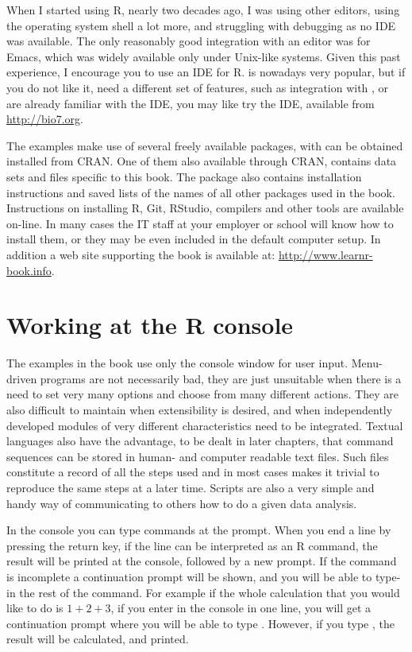 \documentclass[krantz2,ChapterTOCs]{krantz}\usepackage{knitr}
\begin{document}
When I started using R, nearly two decades ago, I was using other editors, using the operating system shell a lot more, and struggling with debugging as no IDE was available. The only reasonably good integration with an editor was for Emacs, which was widely available only under Unix-like systems. Given this past experience, I encourage you to use an IDE for R. \RStudio is nowadays very popular, but if you do not like it, need a different set of features, such as integration with , or are already familiar with the  IDE, you may like try the  IDE, available from \url{http://bio7.org}.

The examples make use of several freely available packages, with can be obtained installed from CRAN. One of them  also available through CRAN, contains data sets and files specific to this book. The  package also contains installation instructions and saved lists of the names of all other packages used in the book. Instructions on installing R, Git, RStudio, compilers and other tools are available on-line. In many cases the IT staff at your employer or school will know how to install them, or they may be even included in the default computer setup. In addition a web site supporting the book is available at: \url{http://www.learnr-book.info}.

\section{Working at the R console}
The examples in the book use only the console window for user input. Menu-driven programs are not necessarily bad, they are just unsuitable when there is a need to set very many options and choose from many different actions. They are also difficult to maintain when extensibility is desired, and when independently developed modules of very different characteristics need to be integrated. Textual languages also have the advantage, to be dealt in later chapters, that command sequences can be stored in human- and computer readable text files. Such files constitute a record of all the steps used and in most cases makes it trivial to reproduce the same steps at a later time. Scripts are also a very simple and handy way of communicating to others how to do a given data analysis.

In the console you can type commands at the \code{>} prompt.
When you end a line by pressing the return key, if the line can be interpreted as an R command, the result will be printed at the console, followed by a new \code{>} prompt.
If the command is incomplete a \code{+} continuation prompt will be shown, and you will be able to type-in the rest of the command. For example if the whole calculation that you would like to do is $1 + 2 + 3$, if you enter in the console  in one line, you will get a continuation prompt where you will be able to type . However, if you type , the result will be calculated, and printed.
\end{document}
